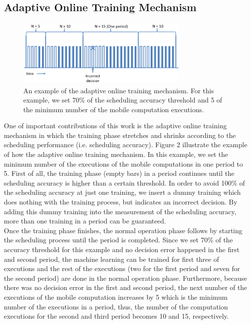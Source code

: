 \documentclass[10pt, conference, compsocconf]{IEEEtran}
\begin{document}
\subsection{Adaptive Online Training Mechanism}
%
\begin{figure}
\centering
\includegraphics[height=3.3cm, width=8.5cm]{Figure/figure2}
\caption{An example of the adaptive online training mechanism. For this
example, we set 70\% of the scheduling accuracy threshold and 5 of the
minimum number of the mobile computation executions.}
\end{figure}
%
One of important contributions of this work is the adaptive online
training mechanism in which the training phase stretches and shrinks
according to the scheduling performance (i.e. scheduling accuracy).
%
Figure 2 illustrate the example of how the adaptive online training
mechanism.
%
In this example, we set the minimum number of the executions of the
mobile computations in one period to 5.
%
First of all, the training phase (empty bars) in a period
continues until the scheduling accuracy is higher than a certain
threshold.
%
In order to avoid 100\% of the scheduling accuracy at just one training,
we insert a dummy training which does nothing with the training process,
but indicates an incorrect decision. 
%
By adding this dummy training into the measurement of the scheduling
accuracy, more than one training in a period can be guaranteed.\\
%
\indent Once the training phase finishes, the normal operation phase
follows by starting the scheduling process until the period is
completed.
%
Since we set 70\% of the accuracy threshold for this example and no
decision error happened in the first and second period, the machine
learning can be trained for first three of executions and the rest of
the executions (two for the first period and seven for the second
period) are done in the normal operation phase. 
%
Furthermore, because there was no decision error in the first and second
period, the next number of the executions of the mobile computation
increases by 5 which is the minimum number of the executions in a
period, thus, the number of the computation executions for the second
and third period becomes 10 and 15, respectively.
\end{document}
